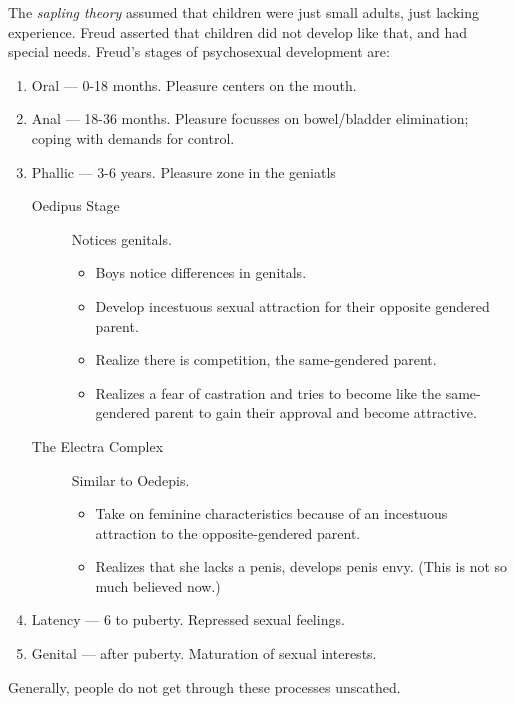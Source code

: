 \documentclass[12pt]{article}
\begin{document}
The \emph{sapling theory} assumed that children were just small adults, just
lacking experience. Freud asserted that children did not develop like that, and
had special needs.  Freud's stages of psychosexual development are:
\begin{enumerate}
	\item Oral --- 0-18 months. Pleasure centers on the mouth.
	\item Anal --- 18-36 months. Pleasure focusses on bowel/bladder elimination;
		coping with demands for control.
	\item Phallic --- 3-6 years. Pleasure zone in the geniatls
		\begin{description}
			\item[Oedipus Stage] Notices genitals.
				\begin{itemize}
					\item Boys notice differences in genitals.
					\item Develop incestuous sexual attraction for their
						opposite gendered parent.
					\item Realize there is competition, the same-gendered
						parent.
					\item Realizes a fear of castration and tries to become like
						the same-gendered parent to gain their approval and
						become attractive.
				\end{itemize}
			\item[The Electra Complex] Similar to Oedepis.
				\begin{itemize}
					\item Take on feminine characteristics because of an
						incestuous attraction to the opposite-gendered parent.
					\item Realizes that she lacks a penis, develops penis envy.
						(This is not so much believed now.)
				\end{itemize}
		\end{description}
	\item Latency --- 6 to puberty. Repressed sexual feelings.
	\item Genital --- after puberty. Maturation of sexual interests.
\end{enumerate}

Generally, people do not get through these processes unscathed.
\end{document}
